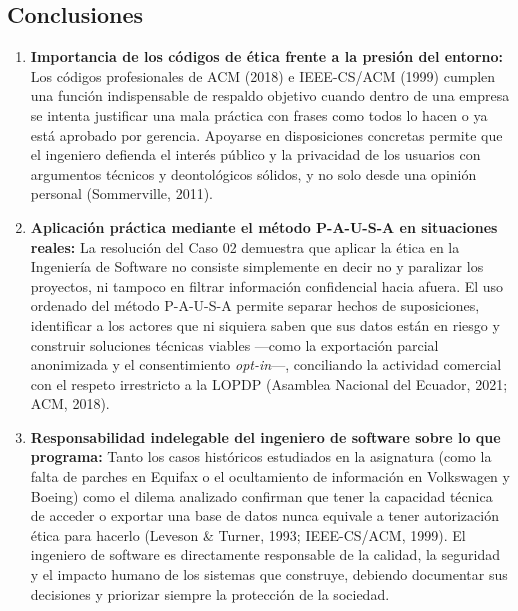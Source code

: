 \documentclass[12pt,a4paper,oneside]{article}
\begin{document}
\subsection{Conclusiones}
\begin{enumerate}[leftmargin=1.8em,itemsep=4pt]
    \item \textbf{Importancia de los códigos de ética frente a la presión del entorno:} Los códigos profesionales de ACM (2018) e IEEE-CS/ACM (1999) cumplen una función indispensable de respaldo objetivo cuando dentro de una empresa se intenta justificar una mala práctica con frases como \guillemotleft todos lo hacen\guillemotright{} o \guillemotleft ya está aprobado por gerencia\guillemotright. Apoyarse en disposiciones concretas permite que el ingeniero defienda el interés público y la privacidad de los usuarios con argumentos técnicos y deontológicos sólidos, y no solo desde una opinión personal (Sommerville, 2011).

    \item \textbf{Aplicación práctica mediante el método P-A-U-S-A en situaciones reales:} La resolución del Caso 02 demuestra que aplicar la ética en la Ingeniería de Software no consiste simplemente en decir \guillemotleft no\guillemotright{} y paralizar los proyectos, ni tampoco en filtrar información confidencial hacia afuera. El uso ordenado del método P-A-U-S-A permite separar hechos de suposiciones, identificar a los actores que ni siquiera saben que sus datos están en riesgo y construir soluciones técnicas viables —como la exportación parcial anonimizada y el consentimiento \textit{opt-in}—, conciliando la actividad comercial con el respeto irrestricto a la LOPDP (Asamblea Nacional del Ecuador, 2021; ACM, 2018).

    \item \textbf{Responsabilidad indelegable del ingeniero de software sobre lo que programa:} Tanto los casos históricos estudiados en la asignatura (como la falta de parches en Equifax o el ocultamiento de información en Volkswagen y Boeing) como el dilema analizado confirman que tener la capacidad técnica de acceder o exportar una base de datos nunca equivale a tener autorización ética para hacerlo (Leveson \& Turner, 1993; IEEE-CS/ACM, 1999). El ingeniero de software es directamente responsable de la calidad, la seguridad y el impacto humano de los sistemas que construye, debiendo documentar sus decisiones y priorizar siempre la protección de la sociedad.
\end{enumerate}

\clearpage
\end{document}
